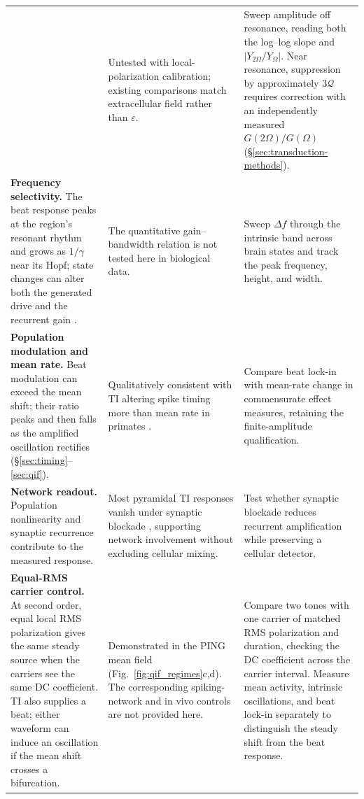 \documentclass[11pt,a4paper]{article}
\newif\ifsupp
\providecommand{\DIFaddtex}[1]{{\protect\color{blue} \sf #1}} %
\providecommand{\DIFaddend}{} %
\providecommand{\DIFadd}[1]{\texorpdfstring{\DIFaddtex{#1}}{#1}} %
\begin{document}
\begin{longtable}{@{}>{\raggedright\arraybackslash}p{}
 >{\raggedright\arraybackslash}p{}
 >{\raggedright\arraybackslash}p{}@{}}
{}& \DIFadd{Untested with local-polarization calibration; existing comparisons match
extracellular field rather than $\varepsilon$.
}& \DIFadd{Sweep amplitude off resonance, reading both the log--log slope and
$|Y_{2\Omega}/Y_\Omega|$. Near resonance, suppression by approximately
$3\mathcal Q$ requires correction with an independently measured
$G(2\Omega)/G(\Omega)$ (\S\ref{sec:transduction-methods}). }\\[4pt]
\DIFadd{\textbf{Frequency selectivity.} The beat response peaks at the region's resonant
rhythm and grows as $1/\gamma$ near its Hopf; state changes can alter both the
generated drive and the recurrent gain \cite{ruffini2025cfc}.
}& \DIFadd{The quantitative gain--bandwidth relation is not tested here in biological data.
}& \DIFadd{Sweep $\Delta f$ through the intrinsic band across brain states and track the
peak frequency, height, and width. }\\[4pt]
\DIFadd{\textbf{Population modulation and mean rate.} Beat modulation can exceed the mean shift; their ratio
peaks and then falls as the amplified oscillation rectifies
(\S\ref{sec:timing}--\ref{sec:qif}).
}& \DIFadd{Qualitatively consistent with TI altering spike timing more than mean rate in
primates \cite{vieira2024}.
}& \DIFadd{Compare beat lock-in with mean-rate change in commensurate effect measures,
retaining the finite-amplitude qualification. }\\[4pt]
\DIFadd{\textbf{Network readout.} Population nonlinearity and synaptic recurrence contribute
to the measured response.
}& \DIFadd{Most pyramidal TI responses vanish under synaptic blockade \cite{caldas2024},
supporting network involvement without excluding cellular mixing.
}& \DIFadd{Test whether synaptic blockade reduces recurrent amplification while preserving
a cellular detector. }\\[4pt]
\DIFadd{\textbf{Equal-RMS carrier control.} At second order, equal local RMS
polarization gives the same steady source when the carriers see the same DC
coefficient. TI also supplies a beat; either waveform can induce an oscillation
if the mean shift crosses a bifurcation.
}& \DIFadd{Demonstrated in the PING mean field (Fig.~\ref{fig:qif_regimes}c,d).
The corresponding spiking-network and in vivo controls are not provided here.
}& \DIFadd{Compare two tones with one carrier of matched RMS polarization and duration,
checking the DC coefficient across the carrier interval. Measure mean activity,
intrinsic oscillations, and beat lock-in separately to distinguish the steady
shift from the beat response. }\\
\end{longtable}
\endgroup
\DIFaddend


\ifsupp
\clearpage


\fi
\fi
\end{document}
